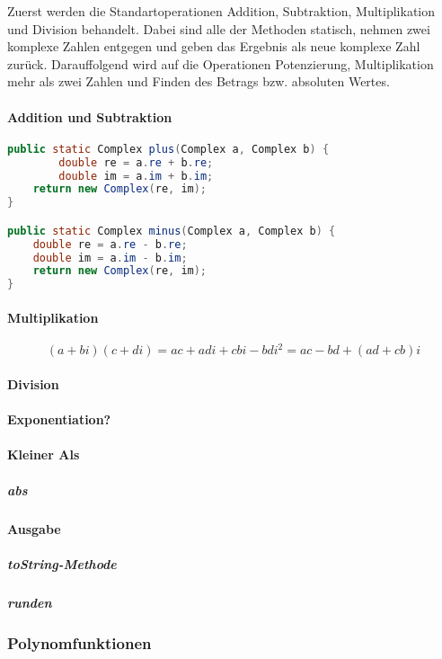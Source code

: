\documentclass[12pt]{article}
\begin{document}
Zuerst werden die Standartoperationen Addition, Subtraktion, Multiplikation und Division behandelt. Dabei sind alle der Methoden statisch, nehmen zwei komplexe Zahlen entgegen und geben das Ergebnis als neue komplexe Zahl zurück. Darauffolgend wird auf die Operationen Potenzierung, Multiplikation mehr als zwei Zahlen und Finden des Betrags bzw. absoluten Wertes. 

\paragraph{Addition und Subtraktion}
\begin{lstlisting}[language=Java, title={Complex.java: Z. 19-29}]
public static Complex plus(Complex a, Complex b) {
        double re = a.re + b.re;
        double im = a.im + b.im;
    return new Complex(re, im);
}

public static Complex minus(Complex a, Complex b) {
    double re = a.re - b.re;
    double im = a.im - b.im;
    return new Complex(re, im);
}
\end{lstlisting}


\paragraph{Multiplikation}
\begin{displaymath}
    (a+bi)(c+di) = ac+adi+cbi-bdi^2 = ac-bd+(ad+cb)i
\end{displaymath}
\paragraph{Division}
\paragraph{Exponentiation?}
\paragraph{Kleiner Als}


    \subparagraph{abs}

    \paragraph{Ausgabe}
    \subparagraph{toString-Methode}
    \subparagraph{runden}

    
    \subsubsection{Polynomfunktionen}
\end{document}
